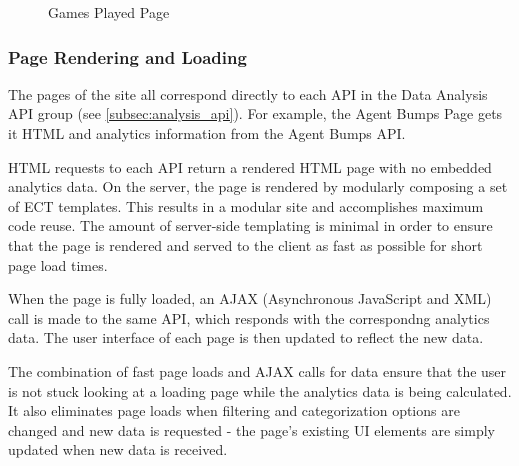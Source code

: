 \begin{figure}[H]
	\caption[Analytics Site: ``Games Played'' UI]{\label{fig:games_played} Games Played Page}
\end{figure}

\subsubsection{Page Rendering and Loading}

The pages of the site all correspond directly to each API in the Data Analysis API group (see \ref{subsec:analysis_api}). For example, the Agent Bumps Page gets it HTML and analytics information from the Agent Bumps API.

HTML requests to each API return a rendered HTML page with no embedded analytics data. On the server, the page is rendered by modularly composing a set of ECT templates. This results in a modular site and accomplishes maximum code reuse. The amount of server-side templating is minimal in order to ensure that the page is rendered and served to the client as fast as possible for short page load times.

When the page is fully loaded, an AJAX (Asynchronous JavaScript and XML) call is made to the same API, which responds with the correspondng analytics data. The user interface of each page is then updated to reflect the new data. 

The combination of fast page loads and AJAX calls for data ensure that the user is not stuck looking at a loading page while the analytics data is being calculated. It also eliminates page loads when filtering and categorization options are changed and new data is requested - the page's existing UI elements are simply updated when new data is received.


